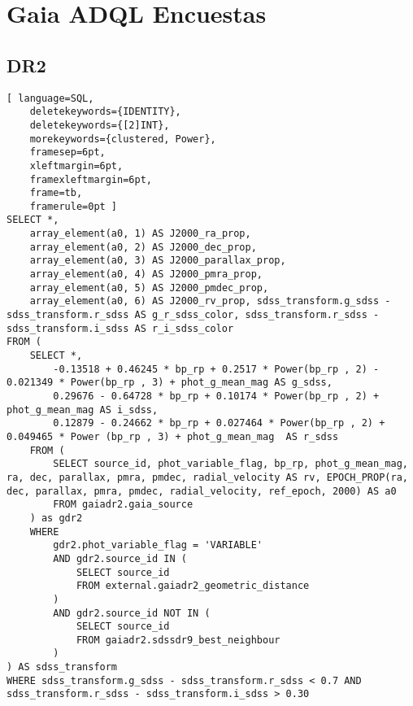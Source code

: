 \chapter{Gaia ADQL Encuestas} \label{apendice:gaiaAdql}

\section{DR2}
\begin{lstlisting}[ language=SQL,
	deletekeywords={IDENTITY},
	deletekeywords={[2]INT},
	morekeywords={clustered, Power},
	framesep=6pt,
	xleftmargin=6pt,
	framexleftmargin=6pt,
	frame=tb,
	framerule=0pt ]
SELECT *, 
	array_element(a0, 1) AS J2000_ra_prop,
	array_element(a0, 2) AS J2000_dec_prop,
	array_element(a0, 3) AS J2000_parallax_prop,
	array_element(a0, 4) AS J2000_pmra_prop,
	array_element(a0, 5) AS J2000_pmdec_prop,
	array_element(a0, 6) AS J2000_rv_prop, sdss_transform.g_sdss - sdss_transform.r_sdss AS g_r_sdss_color, sdss_transform.r_sdss - sdss_transform.i_sdss AS r_i_sdss_color
FROM (
	SELECT *,
		-0.13518 + 0.46245 * bp_rp + 0.2517 * Power(bp_rp , 2) - 0.021349 * Power(bp_rp , 3) + phot_g_mean_mag AS g_sdss,
		0.29676 - 0.64728 * bp_rp + 0.10174 * Power(bp_rp , 2) + phot_g_mean_mag AS i_sdss,
		0.12879 - 0.24662 * bp_rp + 0.027464 * Power(bp_rp , 2) +	0.049465 * Power (bp_rp , 3) + phot_g_mean_mag	AS r_sdss
	FROM (
		SELECT source_id, phot_variable_flag, bp_rp, phot_g_mean_mag, ra, dec, parallax, pmra, pmdec, radial_velocity AS rv, EPOCH_PROP(ra, dec, parallax, pmra, pmdec, radial_velocity, ref_epoch, 2000) AS a0
		FROM gaiadr2.gaia_source
	) as gdr2
	WHERE
		gdr2.phot_variable_flag = 'VARIABLE'
		AND gdr2.source_id IN (
			SELECT source_id 
			FROM external.gaiadr2_geometric_distance
		)
		AND gdr2.source_id NOT IN (
			SELECT source_id 
			FROM gaiadr2.sdssdr9_best_neighbour
		)
) AS sdss_transform
WHERE sdss_transform.g_sdss - sdss_transform.r_sdss < 0.7 AND sdss_transform.r_sdss - sdss_transform.i_sdss > 0.30
\end{lstlisting}

